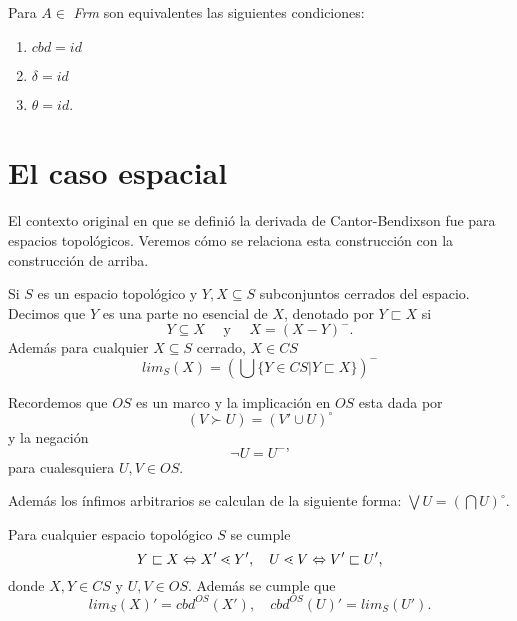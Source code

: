 \begin{corollary}
Para $A\in$ \textit{Frm} son equivalentes las siguientes condiciones:
\begin{enumerate}
\item $cbd=id$
\item $\delta=id$
\item $\theta=id$.
\end{enumerate}
\end{corollary}

\section{El caso espacial}
El contexto original en que se definió la derivada de
Cantor-Bendixson fue para espacios topológicos.
Veremos cómo se relaciona esta construcción con la construcción
de arriba.

\begin{definition}
Si $S$ es un espacio topológico y $Y, X\subseteq S$ subconjuntos cerrados del espacio. Decimos que $Y$ es una parte no esencial de $X$, denotado por $Y\sqsubset X$ si 
$$Y\subseteq X \quad\mbox{ y }\quad X=(X-Y)^-.$$ 
Además para cualquier $X\subseteq S$ cerrado, $X\in CS$
$$lim_S(X)=\left(\bigcup\{Y\in CS|Y\sqsubset X\}\right)^-$$
\end{definition}

\noindent
Recordemos que $OS$ es un marco y la implicación en $OS$ esta dada por $$(V\succ U)=(V'\cup U)^\circ$$ 
y la negación $$\neg U=U^-\mbox{'}$$ para cualesquiera $U,V\in OS$.

\noindent
Además los ínfimos arbitrarios se calculan de la siguiente forma: $\bigvee U=\left(\bigcap U\right)^\circ$.

\begin{lemma}\label{Lema50}
Para cualquier espacio topológico $S$ se cumple $$Y\sqsubset X\Leftrightarrow X'\lessdot Y',\mbox\quad U\lessdot V\Leftrightarrow V'\sqsubset U',$$
donde $X, Y\in CS$ y $U, V\in OS$. Además se cumple que $$lim_S(X)'=cbd^{OS}(X'),\quad cbd^{OS}(U)'=lim_S(U').$$
\end{lemma}

